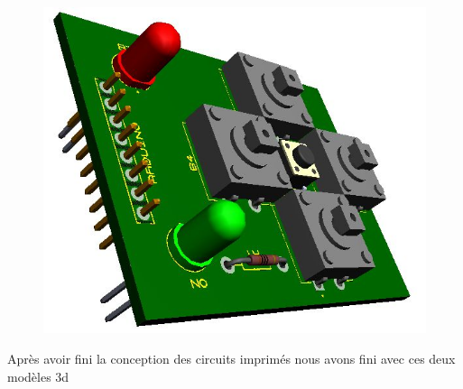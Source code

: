 \begin{figure}[!htbp]
\begin{subfigure}[m]{.48\linewidth}
    \end{subfigure}
\end{figure}

\begin{figure}[!htbp]
    \centering
    \includegraphics[width=.5\linewidth]{assets/conception1/img81.jpg}
\end{figure}

\FloatBarrier

Après avoir fini la conception des circuits imprimés nous avons fini avec ces deux modèles 3d

